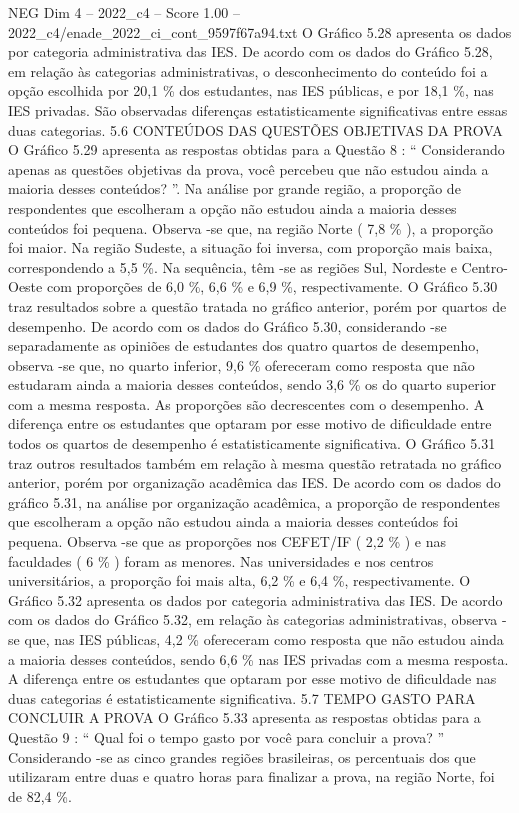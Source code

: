 \begin{textsample}{NEG Dim 4 – 2022\_c4 – Score 1.00 – 2022\_c4/enade\_2022\_ci\_cont\_9597f67a94.txt}
O Gráfico 5.28 apresenta os dados por categoria administrativa das IES.
De acordo com os dados do Gráfico 5.28, em relação às categorias administrativas, o desconhecimento do conteúdo foi a opção escolhida por 20,1 \% dos estudantes, nas IES públicas, e por 18,1 \%, nas IES privadas.
São observadas diferenças estatisticamente significativas entre essas duas categorias. 5.6 CONTEÚDOS DAS QUESTÕES OBJETIVAS DA PROVA O Gráfico 5.29 apresenta as respostas obtidas para a Questão 8 : “ Considerando apenas as questões objetivas da prova, você percebeu que não estudou ainda a maioria desses conteúdos? ”.
Na análise por grande região, a proporção de respondentes que escolheram a opção não estudou ainda a maioria desses conteúdos foi pequena.
Observa -se que, na região Norte ( 7,8 \% ), a proporção foi maior.
Na região Sudeste, a situação foi inversa, com proporção mais baixa, correspondendo a 5,5 \%.
Na sequência, têm -se as regiões Sul, Nordeste e Centro-Oeste com proporções de 6,0 \%, 6,6 \% e 6,9 \%, respectivamente.
O Gráfico 5.30 traz resultados sobre a questão tratada no gráfico anterior, porém por quartos de desempenho.
De acordo com os dados do Gráfico 5.30, considerando -se separadamente as opiniões de estudantes dos quatro quartos de desempenho, observa -se que, no quarto inferior, 9,6 \% ofereceram como resposta que não estudaram ainda a maioria desses conteúdos, sendo 3,6 \% os do quarto superior com a mesma resposta.
As proporções são decrescentes com o desempenho.
A diferença entre os estudantes que optaram por esse motivo de dificuldade entre todos os quartos de desempenho é estatisticamente significativa.
O Gráfico 5.31 traz outros resultados também em relação à mesma questão retratada no gráfico anterior, porém por organização acadêmica das IES.
De acordo com os dados do gráfico 5.31, na análise por organização acadêmica, a proporção de respondentes que escolheram a opção não estudou ainda a maioria desses conteúdos foi pequena.
Observa -se que as proporções nos CEFET/IF ( 2,2 \% ) e nas faculdades ( 6 \% ) foram as menores.
Nas universidades e nos centros universitários, a proporção foi mais alta, 6,2 \% e 6,4 \%, respectivamente.
O Gráfico 5.32 apresenta os dados por categoria administrativa das IES.
De acordo com os dados do Gráfico 5.32, em relação às categorias administrativas, observa -se que, nas IES públicas, 4,2 \% ofereceram como resposta que não estudou ainda a maioria desses conteúdos, sendo 6,6 \% nas IES privadas com a mesma resposta.
A diferença entre os estudantes que optaram por esse motivo de dificuldade nas duas categorias é estatisticamente significativa. 5.7 TEMPO GASTO PARA CONCLUIR A PROVA O Gráfico 5.33 apresenta as respostas obtidas para a Questão 9 : “ Qual foi o tempo gasto por você para concluir a prova? ” Considerando -se as cinco grandes regiões brasileiras, os percentuais dos que utilizaram entre duas e quatro horas para finalizar a prova, na região Norte, foi de 82,4 \%.

\end{textsample}
